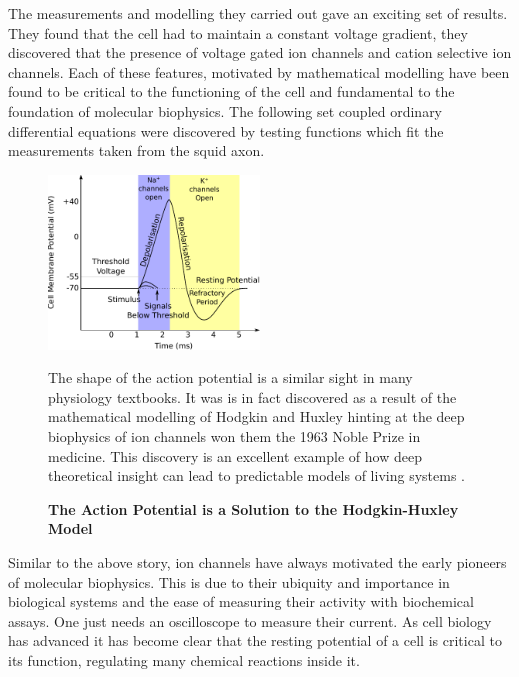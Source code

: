 The measurements and modelling they carried out gave an exciting set of results. They found that the cell had to maintain a constant voltage gradient, they discovered that the presence of voltage gated ion channels and cation selective ion channels\cite{hodgkin1952}. Each of these features, motivated by mathematical modelling have been found to be critical to the functioning of the cell and fundamental to the foundation of molecular biophysics. The following set coupled ordinary differential equations were discovered by testing functions which fit the measurements taken from the squid axon.   

\begin{figure}
	\begin{center}
		\includegraphics[width=0.5\textwidth]{figures/Hodgkin-Huxley_action_potential.pdf}
	\end{center}
	\captionsetup{singlelinecheck = false, justification=raggedright}
	\caption[The Action Potential is a Solution to the Hodkin-Huxley Model] {\textbf{The Action Potential is a Solution to the Hodgkin-Huxley Model }}{The shape of the action potential is a similar sight in many physiology textbooks. It was is in fact discovered as a result of the mathematical modelling of Hodgkin and Huxley hinting at the deep biophysics of ion channels won them the 1963 Noble Prize in medicine. This discovery is an excellent example of how deep theoretical insight can lead to predictable models of living systems \cite{hodgkin1952, hodgkin1952a, hodgkin1952b, hodgkin1952c, hodgkin1952d}.}
	\label{action_potential_graphic}
\end{figure}

Similar to the above story, ion channels have always motivated the early pioneers of molecular biophysics. This is due to their ubiquity and importance in biological systems and the ease of measuring their activity with biochemical assays. One just needs an oscilloscope to measure their current. As cell biology has advanced it has become clear that the resting potential of a cell is critical to its function, regulating many chemical reactions inside it.

